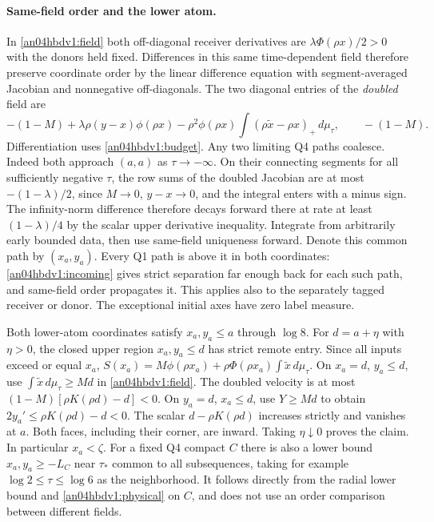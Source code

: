 \documentclass[11pt]{article}
\newcommand{\dd}{\,d}
\begin{document}
\paragraph{Same-field order and the lower atom.}
In \eqref{an04hbdv1:field} both off-diagonal receiver derivatives
are $\lambda\Phi(\rho x)/2>0$ with the donors held fixed. Differences
in this same time-dependent field therefore preserve coordinate order
by the linear difference equation with segment-averaged Jacobian
and nonnegative off-diagonals. The two diagonal entries of the
\emph{doubled} field are
\[
 -(1-M)+\lambda\rho(y-x)\phi(\rho x)
 -\rho^2\phi(\rho x)\int(\rho\tilde x-\rho x)_+\dd\mu_\tau,
 \qquad -(1-M).
\]
Differentiation uses \eqref{an04hbdv1:budget}.
Any two limiting Q4 paths coalesce. Indeed both approach $(a,a)$
as $\tau\to-\infty$. On their connecting segments for all sufficiently
negative $\tau$, the row sums of the doubled Jacobian are at most
$-(1-\lambda)/2$, since $M\to0$, $y-x\to0$, and the integral enters
with a minus sign. The infinity-norm difference therefore decays
forward there at rate at least $(1-\lambda)/4$ by the scalar
upper derivative inequality. Integrate from arbitrarily early bounded
data, then use same-field uniqueness forward. Denote this common
path by $(x_a,y_a)$. Every Q1 path is above it in both coordinates:
\eqref{an04hbdv1:incoming} gives strict separation far enough back
for each such path, and same-field order propagates it. This applies
also to the separately tagged receiver or donor. The exceptional
initial axes have zero label measure.

Both lower-atom coordinates satisfy $x_a,y_a\le a$ through $\log8$.
For $d=a+\eta$ with $\eta>0$, the closed upper region $x_a,y_a\le d$
has strict remote entry. Since all inputs exceed or equal $x_a$,
$S(x_a)=M\phi(\rho x_a)+\rho\Phi(\rho x_a)\int\tilde x\dd\mu_\tau$.
On $x_a=d$, $y_a\le d$, use $\int\tilde x\dd\mu_\tau\ge Md$
in \eqref{an04hbdv1:field}. The doubled velocity is at most
$(1-M)[\rho K(\rho d)-d]<0$. On $y_a=d$, $x_a\le d$, use
$Y\ge Md$ to obtain $2y_a'\le\rho K(\rho d)-d<0$.
The scalar $d-\rho K(\rho d)$ increases strictly and vanishes at
$a$. Both faces, including their corner, are inward. Taking
$\eta\downarrow0$ proves the claim. In particular $x_a<\zeta$.
For a fixed Q4 compact $C$ there is also a lower bound $x_a,y_a\ge-L_C$
near $\tau_*$ common to all subsequences, taking for example $\log2\le\tau\le\log6$
as the neighborhood. It follows directly from
the radial lower bound and \eqref{an04hbdv1:physical} on $C$,
and does not use an order comparison between different fields.
\end{document}

